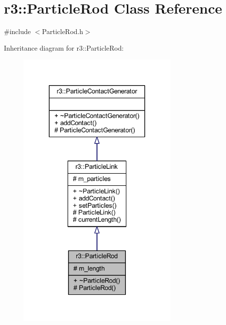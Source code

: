 \hypertarget{classr3_1_1_particle_rod}{}\section{r3\+:\+:Particle\+Rod Class Reference}
\label{classr3_1_1_particle_rod}


{\ttfamily \#include $<$Particle\+Rod.\+h$>$}



Inheritance diagram for r3\+:\+:Particle\+Rod\+:\nopagebreak
\begin{figure}[H]
\begin{center}
\leavevmode
\includegraphics[width=227pt]{classr3_1_1_particle_rod__inherit__graph}
\end{center}
\end{figure}


